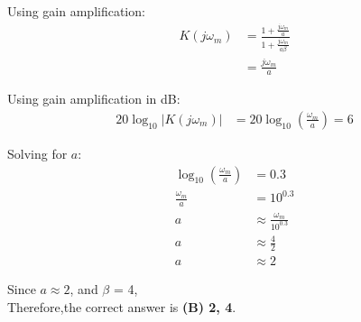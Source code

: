 \documentclass[journal,12pt,twocolumn]{IEEEtran}
\theoremstyle{remark}
\begin{document}
    Using gain amplification:
    \begin{align}
    K(j\omega_m) &= \frac{1 + \frac{j\omega_m}{a}}{1 + \frac{j\omega_m}{a\beta}} \\
    &= \frac{j\omega_m}{a}
    \end{align}
    
    Using gain amplification in dB:
    \begin{align}
    20\log_{10}|K(j\omega_m)| &= 20\log_{10}\left(\frac{\omega_m}{a}\right) = 6
    \end{align}
    
    Solving for \(a\):
    \begin{align}
    \log_{10}\left(\frac{\omega_m}{a}\right) &= 0.3 \\
    \frac{\omega_m}{a} &= 10^{0.3} \\
    a &\approx \frac{\omega_m}{10^{0.3}} \\
    a &\approx \frac{4}{2} \\
    a &\approx 2
    \end{align}
    
    Since \(a \approx 2\), and \(\beta\) = 4, \\
     Therefore,the correct answer is \textbf{(B) 2, 4}.
    
\end{document}
